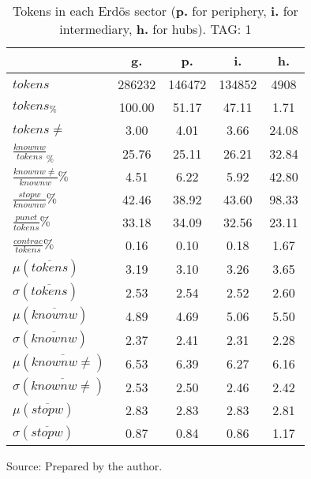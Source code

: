 \begin{table}[h!]
\begin{center}
	\caption{Tokens in each Erd\"os sector ({{\bf p.}} for periphery, {{\bf i.}} for intermediary, {{\bf h.}} for hubs). TAG: 1}\label{tab:tokensInline}
	\def\arraystretch{1.5}
\begin{tabular}{| l || c | c | c | c |}\hline
 & {\bf g.} & {\bf p.} & {\bf i.} & {\bf h.} \\\hline\hline
$tokens$ & 286232  & 146472  & 134852  & 4908 \\
$tokens_{\%}$ & 100.00  & 51.17  & 47.11  & 1.71 \\
$tokens \neq$ & 3.00  & 4.01  & 3.66  & 24.08 \\\hline
$\frac{knownw}{tokens}_\%$ & 25.76  & 25.11  & 26.21  & 32.84 \\
$\frac{knownw \neq}{knownw}\%$ & 4.51  & 6.22  & 5.92  & 42.80 \\\hline
$\frac{stopw}{knownw}\%$ & 42.46  & 38.92  & 43.60  & 98.33 \\
$\frac{punct}{tokens}\%$ & 33.18  & 34.09  & 32.56  & 23.11 \\
$\frac{contrac}{tokens}\%$ & 0.16  & 0.10  & 0.18  & 1.67 \\\hline\hline
$\mu(\overline{tokens})$ & 3.19  & 3.10  & 3.26  & 3.65 \\
$\sigma(\overline{tokens})$ & 2.53  & 2.54  & 2.52  & 2.60 \\\hline
$\mu(\overline{knownw})$ & 4.89  & 4.69  & 5.06  & 5.50 \\
$\sigma(\overline{knownw})$ & 2.37  & 2.41  & 2.31  & 2.28 \\\hline
$\mu(\overline{knownw \neq})$ & 6.53  & 6.39  & 6.27  & 6.16 \\
$\sigma(\overline{knownw \neq})$ & 2.53  & 2.50  & 2.46  & 2.42 \\\hline
$\mu(\overline{stopw})$ & 2.83  & 2.83  & 2.83  & 2.81 \\
$\sigma(\overline{stopw})$ & 0.87  & 0.84  & 0.86  & 1.17 \\\hline
\end{tabular}
\begin{flushleft}
		Source: Prepared by the author.\
\end{flushleft}
\end{center}
\end{table}
